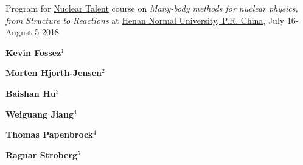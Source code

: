 \documentclass[%
oneside,                 %
final,                   %
10pt]{article}
\begin{document}

\newcommand{\exercisesection}[1]{\subsection*{#1}}






\thispagestyle{empty}

\begin{center}
{\LARGE\bf
\begin{spacing}{1.25}
Program for \href{{http://www.nucleartalent.org}}{Nuclear Talent} course on \emph{Many-body methods for nuclear physics, from Structure to Reactions} at \href{{http://www.htu.cn/english/}}{Henan Normal University, P.R. China}, July 16-August 5 2018
\end{spacing}
}
\end{center}


\begin{center}
{\bf Kevin Fossez${}^{1}$} \\ [0mm]
\end{center}


\begin{center}
{\bf Morten Hjorth-Jensen${}^{2}$} \\ [0mm]
\end{center}


\begin{center}
{\bf Baishan Hu${}^{3}$} \\ [0mm]
\end{center}


\begin{center}
{\bf Weiguang Jiang${}^{4}$} \\ [0mm]
\end{center}


\begin{center}
{\bf Thomas Papenbrock${}^{4}$} \\ [0mm]
\end{center}


\begin{center}
{\bf Ragnar Stroberg${}^{5}$} \\ [0mm]
\end{center}
\end{document}

